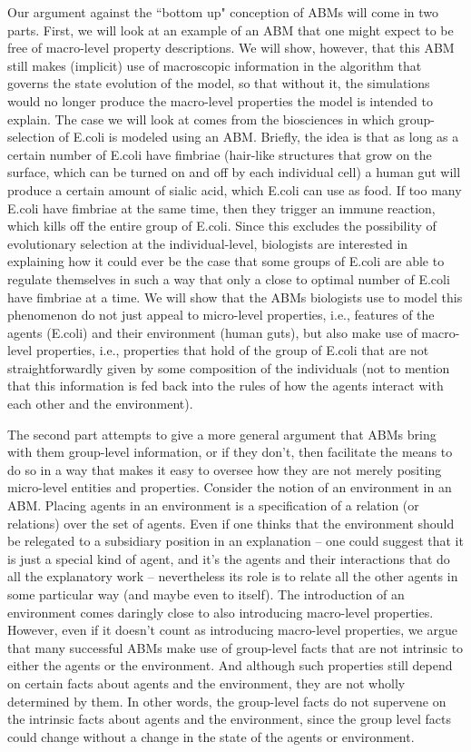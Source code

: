 \documentclass[11pt]{article}
\begin{document}
Our argument against the ``bottom up" conception of ABMs will come in two parts. First, we will look at an example of an ABM that one might expect to be free of macro-level property descriptions.  We will show, however, that this ABM still makes (implicit) use of macroscopic information in the algorithm that governs the state evolution of the model, so that without it, the simulations would no longer produce the macro-level properties the model is intended to explain. The case we will look at comes from the biosciences in which group-selection of E.coli is modeled using an ABM. Briefly, the idea is that as long as a certain number of E.coli have fimbriae (hair-like structures that grow on the surface, which can be turned on and off by each individual cell) a human gut will produce a certain amount of sialic acid, which E.coli can use as food. If too many E.coli have fimbriae at the same time, then they trigger an immune reaction, which kills off the entire group of E.coli. Since this excludes the possibility of evolutionary selection at the individual-level, biologists are interested in explaining how it could ever be the case that some groups of E.coli are able to regulate themselves in such a way that only a close to optimal number of E.coli have fimbriae at a time. We will show that the ABMs biologists use to model this phenomenon do not just appeal to micro-level properties, i.e., features of the agents (E.coli) and their environment (human guts), but also make use of macro-level properties, i.e., properties that hold of the group of E.coli that are not straightforwardly given by some composition of the individuals (not to mention that this information is fed back into the rules of how the agents interact with each other and the environment).

The second part attempts to give a more general argument that ABMs bring with them group-level information, or if they don't, then facilitate the means to do so in a way that makes it easy to oversee how they are not merely positing micro-level entities and properties. Consider the notion of an environment in an ABM. Placing agents in an environment is a specification of a relation (or relations) over the set of agents. Even if one thinks that the environment should be relegated to a subsidiary position in an explanation -- one could suggest that it is just a special kind of agent, and it's the agents and their interactions that do all the explanatory work -- nevertheless its role is to relate all the other agents in some particular way (and maybe even to itself). The introduction of an environment comes daringly close to also introducing macro-level properties. However, even if it doesn't count as introducing macro-level properties, we argue that many successful ABMs make use of group-level facts that are not intrinsic to either the agents or the environment.  And although such properties still depend on certain facts about agents and the environment, they are not wholly determined by them. In other words, the group-level facts do not supervene on the intrinsic facts about agents and the environment, since the group level facts could change without a change in the state of the agents or environment. 
\end{document}
